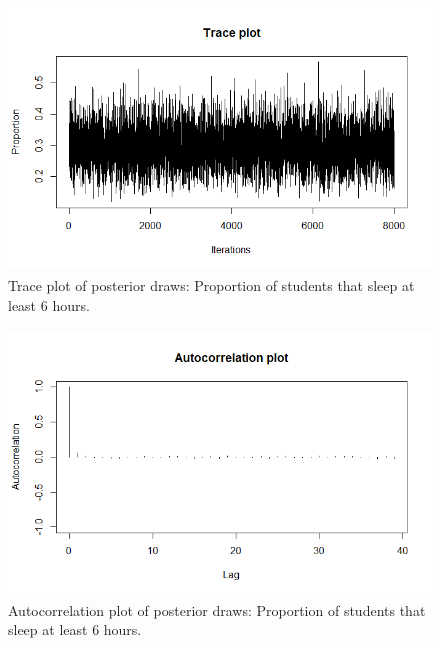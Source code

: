 \begin{enumerate}[leftmargin=*]
\begin{figure}[!h]
	\includegraphics[width=340pt, height=200pt]{Chapters/chapter5/figures/TracePlotProp}
	\caption[List of figure caption goes here]{Trace plot of posterior draws: Proportion of students that sleep at least 6 hours.}\label{fig59}
\end{figure}

\begin{figure}[!h]
	\includegraphics[width=340pt, height=200pt]{Chapters/chapter5/figures/AutocorrPlotProp.png}
	\caption[List of figure caption goes here]{Autocorrelation plot of posterior draws: Proportion of students that sleep at least 6 hours.}\label{fig510}
\end{figure}
  

\end{enumerate}
